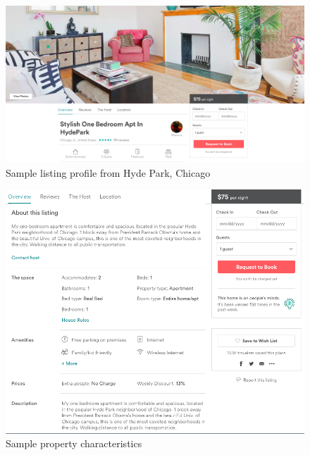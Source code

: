 \singlespacing

\begin{figure}[h]
	\includegraphics[width=1\textwidth]{tables/sample1-cover}
	\caption{Sample listing profile from Hyde Park, Chicago}
\end{figure}
\begin{figure}
	\includegraphics[width=1\textwidth]{tables/sample2-property}
	\caption{Sample property characteristics}
\end{figure}























